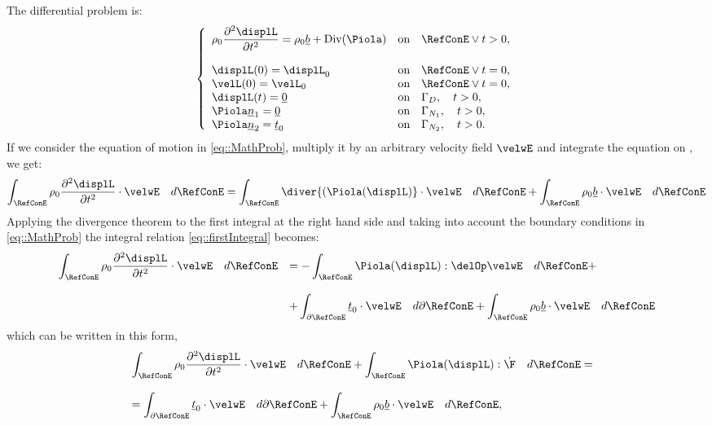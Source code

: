 The differential problem is:
\begin{equation}
\left\{
\begin{array}{lllllll}
  \displaystyle \rho_0\frac{\partial^2\displL}{\partial t^2}=\rho_0\underline{b}+\text{Div}(\Piola) & \text{on} \quad \RefConE \vee t>0,\\
  \\
  \displL(0)=\displL_0 & \text{on} \quad \RefConE \vee t=0,\\
  \velL(0)=\velL_0 & \text{on} \quad \RefConE \vee t=0,\\
  \displL(t)=\underline{0} & \text{on} \quad \Gamma_D, \quad t>0,\\
  \Piola\underline{n}_1=\underline{0} & \text{on} \quad \Gamma_{N_1}, \quad t>0,\\
  \Piola\underline{n}_2=\underline{t}_0 & \text{on} \quad \Gamma_{N_2}, \quad t>0.\\
\end{array}\right.
\label{eq::MathProb}
\end{equation}
If we consider the equation of motion in \eqref{eq::MathProb}, multiply it by an arbitrary velocity field $\velwE$ and integrate the equation on \RefCon, we get:
\begin{equation}
  \displaystyle \int_{\RefConE}\rho_0\frac{\partial^2 \displL}{\partial t^2}\cdot\velwE\quad d\RefConE = \int_{\RefConE}\diver{(\Piola(\displL)}\cdot\velwE\quad d\RefConE + \int_{\RefConE}\rho_0\underline{b}\cdot\velwE\quad d\RefConE
  \label{eq::firstIntegral}
\end{equation}
Applying the divergence theorem to the first integral at the right hand side and taking into account the boundary conditions in \eqref{eq::MathProb} the integral relation \eqref{eq::firstIntegral} becomes:
\begin{equation}
  \begin{array}{lll}
    \displaystyle \int_{\RefConE}\rho_0\frac{\partial^2 \displL}{\partial t^2}\cdot\velwE\quad d\RefConE  & = \displaystyle - \int_{\RefConE}\Piola(\displL):\delOp\velwE\quad d\RefConE + \\
    \\
    & \displaystyle + \int_{\partial \RefConE}\underline{t}_0\cdot\velwE\quad d\partial\RefConE + \int_{\RefConE}\rho_0 \underline{b}\cdot\velwE\quad d\RefConE
    \end{array}
  \label{eq::secondIntegral}
\end{equation}
which can be written in this form,
\begin{equation}
  \begin{array}{lll}
    & \displaystyle \int_{\RefConE}\rho_0\frac{\partial^2 \displL}{\partial t^2}\cdot\velwE\quad d\RefConE  + \int_{\RefConE}\Piola(\displL):\dot{\F}\quad d\RefConE = \\
    \\
    & \displaystyle = \int_{\partial \RefConE}\underline{t}_0\cdot\velwE\quad d\partial\RefConE + \int_{\RefConE}\rho_0 \underline{b}\cdot\velwE\quad d\RefConE,
    \end{array}
  \label{eq::secondIntegral}
\end{equation}
